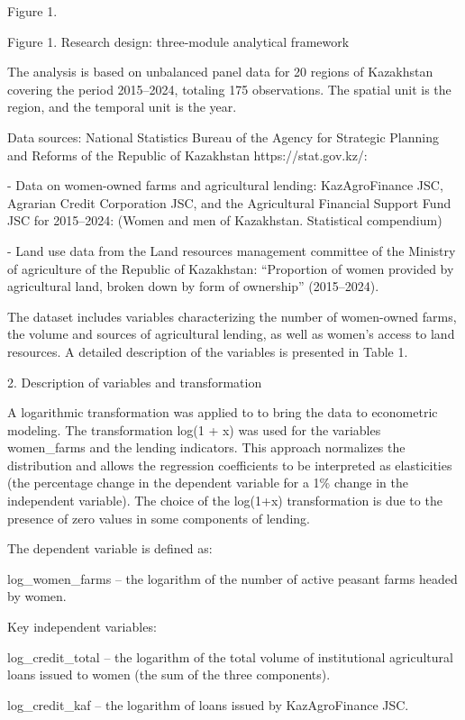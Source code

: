 \documentclass[
]{article}
\begin{document}
Figure 1.

Figure 1. Research design: three-module analytical framework

The analysis is based on unbalanced panel data for 20 regions of
Kazakhstan covering the period 2015--2024, totaling 175 observations.
The spatial unit is the region, and the temporal unit is the year.

Data sources: National Statistics Bureau of the Agency for Strategic
Planning and Reforms of the Republic of Kazakhstan https://stat.gov.kz/:

- Data on women-owned farms and agricultural lending: KazAgroFinance
JSC, Agrarian Credit Corporation JSC, and the Agricultural Financial
Support Fund JSC for 2015--2024: (Women and men of Kazakhstan.
Statistical compendium)

- Land use data from the Land resources management committee of the
Ministry of agriculture of the Republic of Kazakhstan: ``Proportion of
women provided by agricultural land, broken down by form of ownership''
(2015--2024).

The dataset includes variables characterizing the number of women-owned
farms, the volume and sources of agricultural lending, as well as
women's access to land resources. A detailed description of the
variables is presented in Table 1.

2. Description of variables and transformation

A logarithmic transformation was applied to to bring the data to
econometric modeling. The transformation log(1 + x) was used for the
variables women\_farms and the lending indicators. This approach
normalizes the distribution and allows the regression coefficients to be
interpreted as elasticities (the percentage change in the dependent
variable for a 1\% change in the independent variable). The choice of
the log(1+x) transformation is due to the presence of zero values in
some components of lending.

The dependent variable is defined as:

log\_women\_farms -- the logarithm of the number of active peasant farms
headed by women.

Key independent variables:

log\_credit\_total -- the logarithm of the total volume of institutional
agricultural loans issued to women (the sum of the three components).

log\_credit\_kaf -- the logarithm of loans issued by KazAgroFinance JSC.
\end{document}
